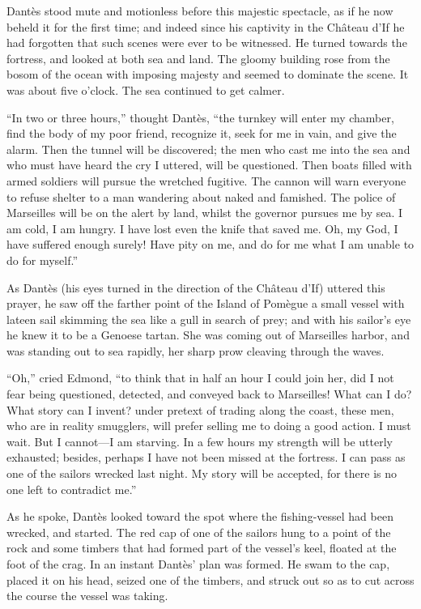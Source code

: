 Dantès stood mute and motionless before this majestic spectacle, as if
he now beheld it for the first time; and indeed since his captivity in
the Château d’If he had forgotten that such scenes were ever to be
witnessed. He turned towards the fortress, and looked at both sea and
land. The gloomy building rose from the bosom of the ocean with
imposing majesty and seemed to dominate the scene. It was about five
o’clock. The sea continued to get calmer.

“In two or three hours,” thought Dantès, “the turnkey will enter my
chamber, find the body of my poor friend, recognize it, seek for me in
vain, and give the alarm. Then the tunnel will be discovered; the men
who cast me into the sea and who must have heard the cry I uttered,
will be questioned. Then boats filled with armed soldiers will pursue
the wretched fugitive. The cannon will warn everyone to refuse shelter
to a man wandering about naked and famished. The police of Marseilles
will be on the alert by land, whilst the governor pursues me by sea. I
am cold, I am hungry. I have lost even the knife that saved me. Oh, my
God, I have suffered enough surely! Have pity on me, and do for me what
I am unable to do for myself.”

As Dantès (his eyes turned in the direction of the Château d’If)
uttered this prayer, he saw off the farther point of the Island of
Pomègue a small vessel with lateen sail skimming the sea like a gull in
search of prey; and with his sailor’s eye he knew it to be a Genoese
tartan. She was coming out of Marseilles harbor, and was standing out
to sea rapidly, her sharp prow cleaving through the waves.

“Oh,” cried Edmond, “to think that in half an hour I could join her,
did I not fear being questioned, detected, and conveyed back to
Marseilles! What can I do? What story can I invent? under pretext of
trading along the coast, these men, who are in reality smugglers, will
prefer selling me to doing a good action. I must wait. But I cannot—I
am starving. In a few hours my strength will be utterly exhausted;
besides, perhaps I have not been missed at the fortress. I can pass as
one of the sailors wrecked last night. My story will be accepted, for
there is no one left to contradict me.”

As he spoke, Dantès looked toward the spot where the fishing-vessel had
been wrecked, and started. The red cap of one of the sailors hung to a
point of the rock and some timbers that had formed part of the vessel’s
keel, floated at the foot of the crag. In an instant Dantès’ plan was
formed. He swam to the cap, placed it on his head, seized one of the
timbers, and struck out so as to cut across the course the vessel was
taking.

